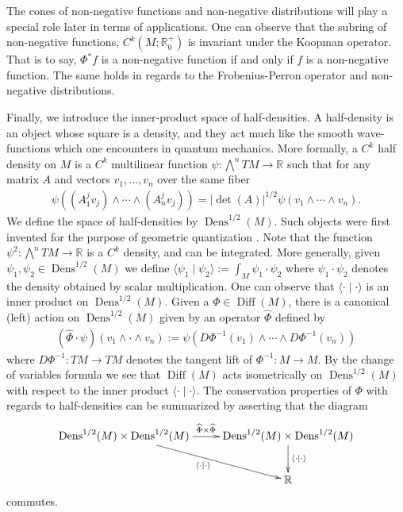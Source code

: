 \documentclass[12pt]{amsart}
\newcommand{\R}{\ensuremath{\mathbb{R}}}
\DeclareMathOperator{\Diff}{Diff}
\DeclareMathOperator{\Dens}{Dens}
\begin{document}
The cones of non-negative functions and non-negative distributions will play a special role later in terms of applications.
One can observe that the subring of non-negative functions, $C^k(M ; \R^+_0)$ is invariant under the Koopman operator.
That is to say, $\Phi^*f$ is a non-negative function if and only if $f$ is a non-negative function.
The same holds in regards to the Frobenius-Perron operator and non-negative distributions.

Finally, we introduce the inner-product space of half-densities.
A half-density is an object whose square is a density, and they act much like
the smooth wave-functions which one encounters in quantum mechanics.
More formally, a $C^k$ half density on $M$ is a $C^k$ multilinear function $\psi : \bigwedge^n TM \to \mathbb{R}$
such that for any matrix $A$ and vectors $v_1,\dots,v_n$ over the same fiber
\begin{align*}
	\psi( (A_1^j v_j) \wedge \cdots \wedge (A_n^j v_j) ) =  | \det(A) |^{1/2} \psi(v_1 \wedge \cdots \wedge v_n).
\end{align*}
We define the space of half-densities by $\Dens^{1/2}(M)$.
Such objects were first invented for the purpose of geometric quantization \cite[see Chapter 4]{GuilleminSternberg1970}.
Note that the function $\psi^2 : \bigwedge^n TM \to \R$ is a $C^k$ density, and can be integrated.
More generally, given $\psi_1,\psi_2 \in \Dens^{1/2}(M)$ we define $\langle \psi_1 \mid \psi_2 \rangle := \int_M \psi_1 \cdot \psi_2$
where $\psi_1 \cdot \psi_2 $ denotes the density obtained by scalar multiplication.
One can observe that $\langle \cdot \mid \cdot \rangle$ is an inner product on $\Dens^{1/2}(M)$.
Given a $\Phi \in \Diff(M)$, there is a canonical (left) action on $\Dens^{1/2}(M)$ given by an operator $\widehat{\Phi}$ defined by
\begin{align*}
	(\widehat{\Phi} \cdot \psi)( v_1 \wedge \cdot \wedge v_n) := \psi( D\Phi^{-1}(v_1) \wedge \cdots \wedge D\Phi^{-1}(v_n) )
\end{align*}
where $D\Phi^{-1} : TM \to TM$ denotes the tangent lift of $\Phi^{-1}:M \to M$.
By the change of variables formula we see that $\Diff(M)$ acts isometrically on $\Dens^{1/2}(M)$ with respect to 
the inner product $\langle \cdot \mid \cdot \rangle$.
The conservation properties of $\Phi$ with regards to half-densities can be summarized by asserting that the diagram
\begin{equation*}
	\xymatrix{
		\Dens^{1/2}(M) \times \Dens^{1/2}(M) \ar[dr]_{\langle \cdot \mid \cdot \rangle} \ar[r]^{\widehat{\Phi} \times \widehat{\Phi}} & \Dens^{1/2}(M) \times \Dens^{1/2}(M) \ar[d]^{\langle \cdot \mid \cdot \rangle} \\
		&\mathbb{R}
	}
\end{equation*}
commutes.
\end{document}
